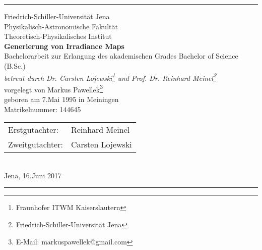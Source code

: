 \newcommand{\vrulefill}{\par\leaders\hbox{$\cdot$}\vfill}

\begin{titlepage}
	\thispagestyle{empty}
	\noindent

	\begin{minipage}{\textwidth}
		\rule{1.5pt}{0.3\textheight}%

		\vspace{5mm}
		\noindent
		{\Large Friedrich-Schiller-Universität Jena \\ Physikalisch-Astronomische Fakultät \\ Theoretisch-Physikalisches Institut \\[2\baselineskip]}
		{\Huge\bfseries Generierung von Irradiance Maps}\\[2\baselineskip]
		{\large Bachelorarbeit zur Erlangung des akademischen Grades Bachelor of Science (B.Sc.)\\}
		{\large \textit{betreut durch Dr. Carsten Lojewski\footnote{Fraunhofer ITWM Kaiserslautern} und Prof. Dr. Reinhard Meinel\footnote{Friedrich-Schiller-Universität Jena}}}\\[4\baselineskip]
		{\Large vorgelegt von Markus Pawellek}\footnote{E-Mail: markuspawellek@gmail.com} \\[\baselineskip]
		{\large geboren am 7.Mai 1995 in Meiningen}\\
		{\large Matrikelnummer: 144645}

		\vspace{0.1\textheight} %
		\noindent
		\begin{tabular}{ll}
			\Large Erstgutachter: & \Large Reinhard Meinel \\
			\Large Zweitgutachter: & \Large Carsten Lojewski
		\end{tabular}
		\\[\baselineskip] %
		\hspace{\textwidth} Jena, 16.Juni 2017
		\vspace{5mm} \\
		\rule{1.5pt}{0.15\textheight}
	\end{minipage}

	\setcounter{page}{1}
\end{titlepage}

